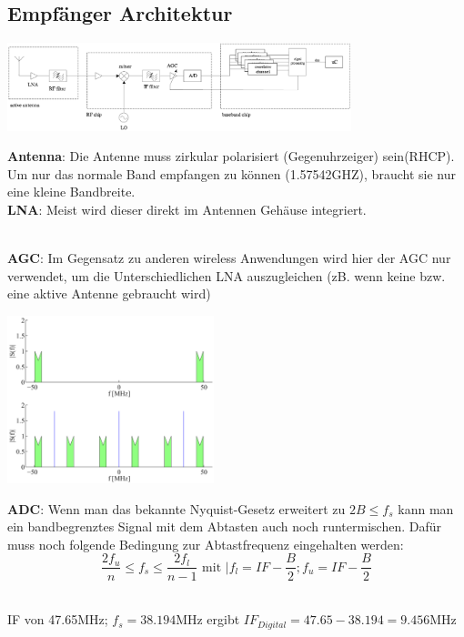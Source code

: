 \subsection{Empfänger Architektur}
	\begin{minipage}{10cm}
		\includegraphics[width=10cm]{./bilder/GPS-Empfangsarchitecture.png}
	\end{minipage}
	\begin{minipage}{8cm}
    	\textbf{Antenna}: Die Antenne muss zirkular polarisiert (Gegenuhrzeiger)
    	sein(RHCP). Um nur das normale Band empfangen zu können (1.57542GHZ),
    	braucht sie nur eine kleine Bandbreite. \\
    	\textbf{LNA}: Meist wird dieser direkt im Antennen Gehäuse integriert.
    \end{minipage}\\
	\textbf{AGC}: Im Gegensatz zu anderen wireless Anwendungen wird hier der
    	AGC nur verwendet, um die Unterschiedlichen LNA auszugleichen (zB. wenn
    	keine bzw. eine aktive Antenne gebraucht wird)\\
    \begin{minipage}{8cm}
    	\includegraphics[width=6cm]{./bilder/GPS-Downsampling.png}
    \end{minipage}
	\begin{minipage}{9cm}
	    \textbf{ADC}: Wenn man das bekannte Nyquist-Gesetz erweitert zu $2B\leq
	    f_s$ kann man ein bandbegrenztes Signal mit dem Abtasten auch noch
	    runtermischen. Dafür muss noch folgende Bedingung zur Abtastfrequenz
	    eingehalten werden:\\
	    $$\frac{2f_u}{n}\leq f_s\leq\frac{2f_l}{n-1}\text{ mit }|
	    f_l=IF-\frac{B}{2};f_u=IF-\frac{B}{2}$$
	   	
    \end{minipage}\\
	IF von 47.65MHz; $f_s=38.194$MHz ergibt $IF_{Digital}=47.65-38.194=9.456$MHz
    
